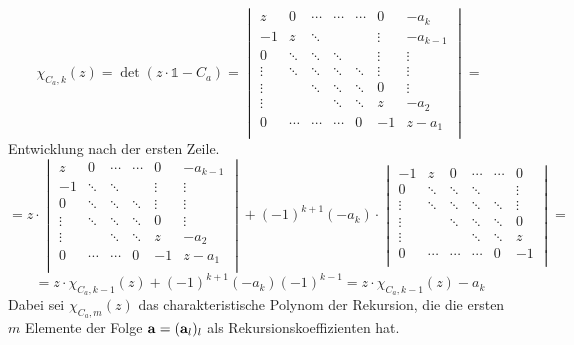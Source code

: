 \begin{flushalphb}
\item
	\[ \chi_{C_a, k}(z) = \det ( z\cdot \mathds{1} - C_a) = 
		\begin{vmatrix}
			z      & 0      & \cdots & \cdots & \cdots & 0      & -a_k     \\
			-1     & z      & \ddots &        &        & \vdots & -a_{k-1} \\
			0      & \ddots & \ddots & \ddots &        & \vdots & \vdots   \\
			\vdots & \ddots & \ddots & \ddots & \ddots & \vdots & \vdots   \\
			\vdots &        & \ddots & \ddots & \ddots & 0      & \vdots   \\
			\vdots &        &        & \ddots & \ddots & z      & -a_2     \\
			0      & \cdots & \cdots & \cdots & 0      & -1     & z - a_1  \\
		\end{vmatrix} = \]
	Entwicklung nach der ersten Zeile.
	\[ = z \cdot \begin{vmatrix}
			z      & 0      & \cdots & \cdots & 0      & -a_{k-1} \\
			-1     & \ddots & \ddots &        & \vdots & \vdots   \\
			0      & \ddots & \ddots & \ddots & \vdots & \vdots   \\
			\vdots & \ddots & \ddots & \ddots & 0      & \vdots   \\
			\vdots &        & \ddots & \ddots & z      & -a_2     \\
			0      & \cdots & \cdots & 0      & -1     & z - a_1  \\
		\end{vmatrix} + (-1)^{k+1}(-a_k) \cdot
		\begin{vmatrix}
			-1     & z      & 0      & \cdots & \cdots & 0      \\
			0      & \ddots & \ddots & \ddots &        & \vdots \\
			\vdots & \ddots & \ddots & \ddots & \ddots & \vdots \\
			\vdots &        & \ddots & \ddots & \ddots & 0      \\
			\vdots &        &        & \ddots & \ddots & z      \\
			0      & \cdots & \cdots & \cdots & 0      & -1     \\
		\end{vmatrix} = \]
	\[ = z \cdot \chi_{C_a, k-1}(z) + (-1)^{k+1}(-a_k)(-1)^{k-1} = z \cdot \chi_{C_a, k-1}(z) - a_k \]
	Dabei sei $\chi_{C_a, m}(z)$ das charakteristische Polynom der
	Rekursion, die die ersten $m$ Elemente der Folge ${\bf a} = ({\bf
	a}_l)_l$ als Rekursionskoeffizienten hat.


\end{flushalphb}
